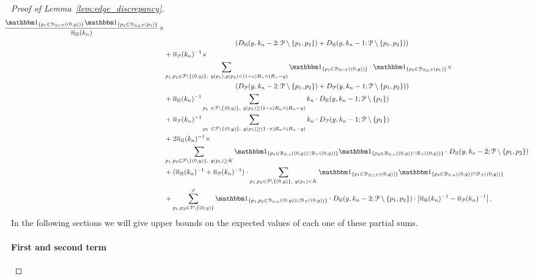 \begin{proof}[Proof of Lemma~\ref{lem:edge_discrepancy}]
\begin{align*}
	\hspace{-10pt}\frac{\ind{p_1 \in \BallInter{(0,y)}} \ind{p_2 \in \BallSym{p_1}}}{\expH} \times \\
& \hspace{3.5cm} \left( D_\H (y,k_n-2;\Pcal \setminus \{ p_1,p_2\}) + 
D_\H (y,k_n-1;\Pcal \setminus \{ p_1,p_2\}) \right)  \\
&+ \expP^{-1} \times \\
& \sum_{p_1,p_2\in \Pcal \setminus \{(0,y)\},\  y(p_1),y(p_2)< (1-\eps)R_n \wedge (R_n-y)} \ind{p_1 \in \BallInter{(0,y)}} \cdot \ind{p_2 \in \BallSym{p_1}} \times \\
& \hspace{3.5cm} \left( D_\Pcal (y,k_n-2;\Pcal \setminus \{ p_1,p_2\}) + 
D_\Pcal (y,k_n-1;\Pcal \setminus \{ p_1,p_2\}) \right)  \\
& +\expH^{-1} \sum_{p_1 \ \in \Pcal \setminus \{(0,y) \}, \ y(p_1) \geq (1-\eps) R_n \wedge (R_n-y)} k_n 
\cdot D_\H (y,k_n-1;\Pcal \setminus \{ p_1\})
\\
&+\expP^{-1} \sum_{p_1 \ \in \Pcal \setminus \{(0,y) \}, \ y(p_1) \geq (1-\eps) R_n \wedge (R_n-y)} k_n 
\cdot D_\Pcal (y,k_n-1;\Pcal \setminus \{ p_1\})
\\
& + 2 \expH^{-1}\times \\
&\sum_{p_1,p_2 \in\Pcal \setminus \{(0,y)\}, \ y(p_1) \geq K}\ind{p_1\in \BallHyp{(0,y)}\setminus \BallPo{(0,y)}} \ind{p_2\in \BallHyp{(0,y)}\cap \BallPo{(0,y)}}  \cdot 
D_\H (y,k_n-2;\Pcal \setminus \{ p_1,p_2\}) \\
&+ (\expH^{-1}+\expP^{-1}) \cdot \sum_{p_1,p_2 \in\Pcal \setminus \{(0,y)\}, \ y(p_1) < K}
\ind{p_1\in \BallSym{(0,y)}} \ind{p_2\in \BallHyp{(0,y)}\cap \BallPo{(0,y)}} \\
& +  \sum_{p_1,p_2 \in \Pcal \setminus \{(0,y)\}}^{\not =} \ind{p_1,p_2 \in \BallHyp{(0,y)}\cup \BallPo{(0,y)}} \cdot 
D_{\H}(y,k_n-2; \Pcal \setminus \{ p_1,p_2\})  \cdot 
\left| \expH^{-1} - \expP^{-1} \right|. 
\end{align*}
In the following sections we will give upper bounds on the expected values of each one of these partial sums. 

\paragraph{First and second term}


\end{proof}
